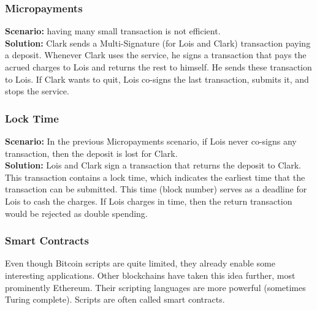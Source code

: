 \documentclass{article}
\begin{document}
\subsubsection{Micropayments}
\textbf{Scenario: }having many small transaction is not efficient.\\
\textbf{Solution: }Clark sends a Multi-Signature (for Lois and Clark) transaction paying a deposit. Whenever Clark uses the service, he signs a transaction that pays the acrued charges to Lois and returns the rest to himself. He sends these transaction to Lois. If Clark wants to quit, Lois co-signs the last transaction, submits it, and stops the service.
\subsubsection{Lock Time}
\textbf{Scenario: }In the previous Micropayments scenario, if Lois never co-signs any transaction, then the deposit is lost for Clark.\\
\textbf{Solution: }Lois and Clark sign a transaction that returns the deposit to Clark. This transaction contains a lock time, which indicates the earliest time that the transaction can be submitted. This time (block number) serves as a deadline for Lois to cash the charges. If Lois charges in time, then the return transaction would be rejected as double spending.
\subsubsection{Smart Contracts}
Even though Bitcoin scripts are quite limited, they already enable some interesting applications. Other blockchains have taken this idea further, most prominently Ethereum. Their scripting languages are more powerful (sometimes Turing complete). Scripts are often called smart contracts.
\end{document}
